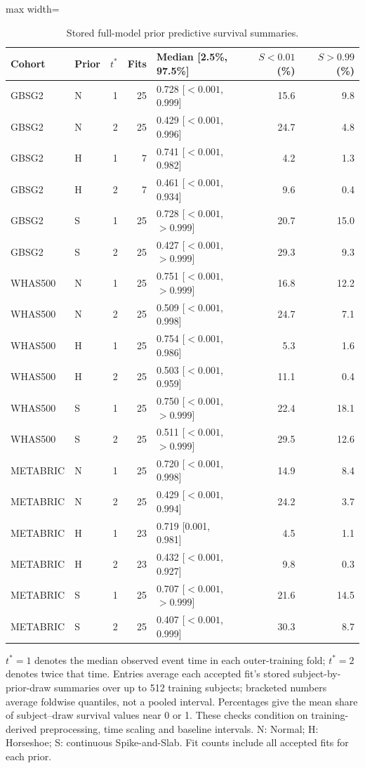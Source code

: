 \begin{table}[htbp]
\centering
\begingroup\singlespacing\footnotesize
\setlength{\tabcolsep}{3pt}
\caption{Stored full-model prior predictive survival summaries.}\label{tab:exam-prior-predictive}
\begin{adjustbox}{max width=\textwidth}
\begin{tabular}{@{}llrrlrr@{}}
\toprule Cohort & Prior & $t^*$ & Fits & Median [2.5\%, 97.5\%] & $S<0.01$ (\%) & $S>0.99$ (\%)\\\midrule
GBSG2 & N & 1 & 25 & 0.728 [$<0.001$, 0.999] & 15.6 & 9.8\\
GBSG2 & N & 2 & 25 & 0.429 [$<0.001$, 0.996] & 24.7 & 4.8\\
GBSG2 & H & 1 & 7 & 0.741 [$<0.001$, 0.982] & 4.2 & 1.3\\
GBSG2 & H & 2 & 7 & 0.461 [$<0.001$, 0.934] & 9.6 & 0.4\\
GBSG2 & S & 1 & 25 & 0.728 [$<0.001$, $>0.999$] & 20.7 & 15.0\\
GBSG2 & S & 2 & 25 & 0.427 [$<0.001$, $>0.999$] & 29.3 & 9.3\\
WHAS500 & N & 1 & 25 & 0.751 [$<0.001$, $>0.999$] & 16.8 & 12.2\\
WHAS500 & N & 2 & 25 & 0.509 [$<0.001$, 0.998] & 24.7 & 7.1\\
WHAS500 & H & 1 & 25 & 0.754 [$<0.001$, 0.986] & 5.3 & 1.6\\
WHAS500 & H & 2 & 25 & 0.503 [$<0.001$, 0.959] & 11.1 & 0.4\\
WHAS500 & S & 1 & 25 & 0.750 [$<0.001$, $>0.999$] & 22.4 & 18.1\\
WHAS500 & S & 2 & 25 & 0.511 [$<0.001$, $>0.999$] & 29.5 & 12.6\\
METABRIC & N & 1 & 25 & 0.720 [$<0.001$, 0.998] & 14.9 & 8.4\\
METABRIC & N & 2 & 25 & 0.429 [$<0.001$, 0.994] & 24.2 & 3.7\\
METABRIC & H & 1 & 23 & 0.719 [0.001, 0.981] & 4.5 & 1.1\\
METABRIC & H & 2 & 23 & 0.432 [$<0.001$, 0.927] & 9.8 & 0.3\\
METABRIC & S & 1 & 25 & 0.707 [$<0.001$, $>0.999$] & 21.6 & 14.5\\
METABRIC & S & 2 & 25 & 0.407 [$<0.001$, 0.999] & 30.3 & 8.7\\
\bottomrule
\end{tabular}
\end{adjustbox}
\par\smallskip
\begin{minipage}{\textwidth}
$t^*=1$ denotes the median observed event time in each outer-training fold; $t^*=2$ denotes twice that time. Entries average each accepted fit's stored subject-by-prior-draw summaries over up to 512 training subjects; bracketed numbers average foldwise quantiles, not a pooled interval. Percentages give the mean share of subject--draw survival values near 0 or 1. These checks condition on training-derived preprocessing, time scaling and baseline intervals. N: Normal; H: Horseshoe; S: continuous Spike-and-Slab. Fit counts include all accepted fits for each prior.
\end{minipage}
\endgroup
\end{table}
